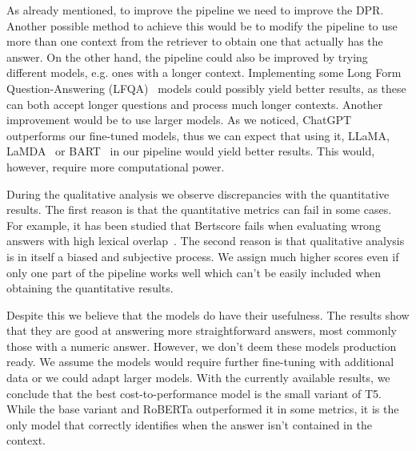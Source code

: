 \documentclass[fleqn,moreauthors,10pt]{ds_report}
\begin{document}
\noindent As already mentioned, to improve the pipeline we need to improve the DPR.
Another possible method to achieve this would be to modify the pipeline to use more than one context from the retriever to obtain one that actually has the answer.
On the other hand, the pipeline could also be improved by trying different models, e.g. ones with a longer context.
Implementing some Long Form Question-Answering (LFQA)~\cite{faneli5} models could possibly yield better results, as these can both accept longer questions and process much longer contexts.
Another improvement would be to use larger models.
As we noticed, ChatGPT outperforms our fine-tuned models, thus we can expect that using it, LLaMA, LaMDA~\cite{thoppilan2022lamda} or BART~\cite{lewis2019bart} in our pipeline would yield better results.
This would, however, require more computational power.

\noindent During the qualitative analysis we observe discrepancies with the quantitative results. The first reason is that the quantitative metrics can fail in some cases. For example, it has been studied that Bertscore fails when evaluating wrong answers with high lexical overlap~\cite{hanna2021fine}. The second reason is that qualitative analysis is in itself a biased and subjective process.
We assign much higher scores even if only one part of the pipeline works well which can't be easily included when obtaining the quantitative results.

\noindent Despite this we believe that the models do have their usefulness. The results show that they are good at answering more straightforward answers, most commonly those with a numeric answer. However, we don't deem these models production ready. We assume the models would require further fine-tuning with additional data or we could adapt larger models. With the currently available results, we conclude that the best cost-to-performance model is the small variant of T5. While the base variant and RoBERTa outperformed it in some metrics, it is the only model that correctly identifies when the answer isn't contained in the context.




\end{document}
